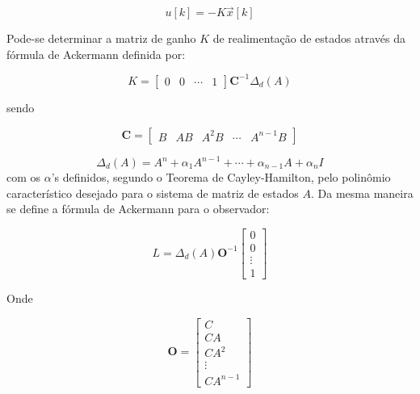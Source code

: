 \documentclass[conference,harvard,brazil,english]{sbatex}
\begin{document}
           \begin{equation}
               u[k]=-K\vec{x}[k]
           \end{equation}
           
           Pode-se determinar a matriz de ganho $K$ de realimentação de estados através da fórmula de Ackermann definida por:
           
           \begin{equation}
                K= \begin{bmatrix}
                    0 & 0 & \cdots & 1
                \end{bmatrix}
                \textbf{C}^{-1}\Delta_d(A)
                \label{ackermann_controla}
           \end{equation}
           
           sendo
           
           \begin{equation}
               \textbf{C}= \begin{bmatrix}
                    B & AB & A^2B & \cdots & A^{n-1}B
               \end{bmatrix}
               \label{controlabilidade}
           \end{equation}
           
           \begin{equation}
               \Delta_d(A)= A^n+\alpha_1A^{n-1}+\cdots+\alpha_{n-1}A+\alpha_nI
           \end{equation}
           com os $\alpha$'s definidos, segundo o Teorema de Cayley-Hamilton, pelo polinômio característico desejado para o sistema de matriz de estados $A$. Da mesma maneira se define a fórmula de Ackermann para o observador:
            
            \begin{equation}
                L=\Delta_d(A)\textbf{O}^{-1}
                \begin{bmatrix}
                    0\\ 
                    0\\ 
                    \vdots\\ 
                    1
                \end{bmatrix}
            \end{equation}
            
            Onde
            
            \begin{equation}
                \textbf{O}=\begin{bmatrix}
                C\\
                CA\\
                CA^2\\
                \vdots\\
                CA^{n-1}
                \end{bmatrix}
            \end{equation}
            
\end{document}
